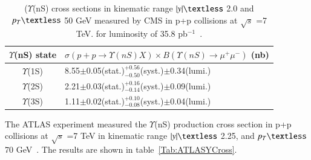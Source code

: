 



\begin{table}
  \begin{center}
    \caption[]{ ($\Upsilon$(nS) cross sections
  in kinematic range $|y|\textless$ 2.0 and $p_{T}\textless$ 50 GeV 
      measured by CMS in p+p collisions at $\surd s$ =7 TeV.
  for luminosity of 35.8 pb$^{-1}$~\cite{CMS:2015xqv}.}
\label{Tab:CMSYCrossPLB}
\begin{tabular}{cl} 
\hline 
\hline
$\Upsilon$(nS) state             &$ \sigma(p+p \rightarrow \Upsilon(nS)X) \times B(\Upsilon(nS)\rightarrow\mu^{+}\mu^{-})$ (nb)    \\              
\hline
$\Upsilon$(1S)                   &8.55$\pm$0.05(stat.)$^{+0.56}_{-0.50}$(syst.)$\pm$0.34(lumi.)\\
$\Upsilon$(2S)                   &2.21$\pm$0.03(stat.)$^{+0.16}_{-0.14}$(syst.)$\pm$0.09(lumi.)\\
$\Upsilon$(3S)                   &1.11$\pm$0.02(stat.)$^{+0.10}_{-0.08}$(syst.)$\pm$0.04(lumi.)\\
\hline
\hline
\end{tabular}
\end{center}
\end{table}


The ATLAS experiment measured the $\Upsilon$(nS) production cross section
in p+p collisions at $\surd s$ =7 TeV in kinematic range $|y|\textless$ 2.25,
and $p_{T}\textless$ 70 GeV~\cite{ATLAS:2012lmu}.  
The results are shown in table~\ref{Tab:ATLASYCross}.


